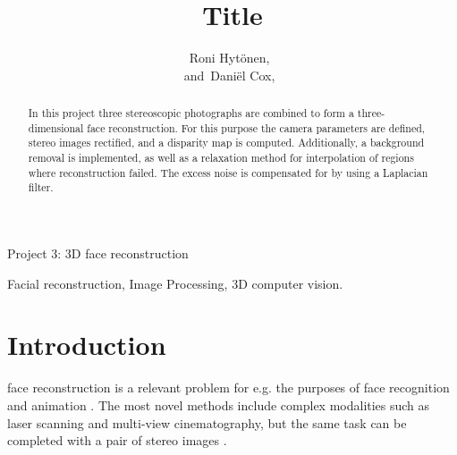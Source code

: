 \documentclass[journal]{IEEEtran}
\begin{document}
%
\title{Title}
%

\author{Roni Hyt\"{o}nen,~  
      
        and~Dani\"el Cox,~%

}



%
{Project 3: 3D face reconstruction}


\maketitle


\begin{abstract}
In this project three stereoscopic photographs are combined to form a three-dimensional face reconstruction. 
For this purpose the camera parameters are defined, stereo images rectified, and a disparity map is computed.
Additionally, a background removal is implemented, as well as a relaxation method for interpolation of regions where reconstruction failed.
The excess noise is compensated for by using a Laplacian filter.

\end{abstract}

\begin{IEEEkeywords}
Facial reconstruction, Image Processing, 3D computer vision.
\end{IEEEkeywords}


\IEEEpeerreviewmaketitle



\section{Introduction}
% 
% 
% 
% 
 face reconstruction is a relevant problem for e.g. the purposes of face recognition and animation \cite{3D_Peng}.
The most novel methods include complex modalities such as laser scanning and multi-view cinematography, but the same task can be completed with a pair of stereo images \cite{Creation_Krutikova}.
\end{document}
